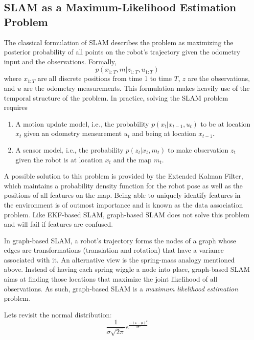 \documentclass[paper=6.14in:9.21in,pagesize=pdftex,11pt,twoside,openright]{scrbook}
\begin{document}
\subsection{SLAM as a Maximum-Likelihood Estimation Problem}
The classical formulation of SLAM describes the problem as maximizing the posterior probability of all points on the robot's trajectory given the odometry input and the observations. Formally,
\begin{equation}
p(x_{1:T},m|z_{1:T},u_{1:T})
\end{equation}
where $ x_{1:T}$ are all discrete positions from time 1 to time $ T$, $ z$ are the observations, and $ u$ are the odometry measurements. This formulation makes heavily use of the temporal structure of the problem. In practice, solving the SLAM problem requires
\begin{enumerate}
\item A motion update model, i.e., the probability $ p(x_t|x_{t-1},u_t)$ to be at location $ x_t$ given an odometry measurement $ u_t$ and being at location $ x_{t-1}$.
\item  A sensor model, i.e., the probability $ p(z_t|x_t,m_t)$ to make observation $ z_t$ given the robot is at location $ x_t$ and the map $ m_t$.
\end{enumerate}
A possible solution to this problem is provided by the Extended Kalman Filter, which maintains a probability density function for the robot pose as well as the positions of all features on the map. Being able to uniquely identify features in the environment is of outmost importance and is known as the data association problem. Like EKF-based SLAM, graph-based SLAM does not solve this problem and will fail if features are confused.

In graph-based SLAM, a robot's trajectory forms the nodes of a graph whose edges are transformations (translation and rotation) that have a variance associated with it. An alternative view is the spring-mass analogy mentioned above. Instead of having each spring wiggle a node into place, graph-based SLAM aims at finding those locations that maximize the joint likelihood of all observations. As such, graph-based SLAM is a \emph{maximum likelihood estimation} problem.

Lets revisit the normal distribution:
\begin{equation}
\frac{1}{\sigma\sqrt{2\pi}}e^{\frac{-(x-\mu)^2}{2\sigma^2}}
\end{equation}
\end{document}
